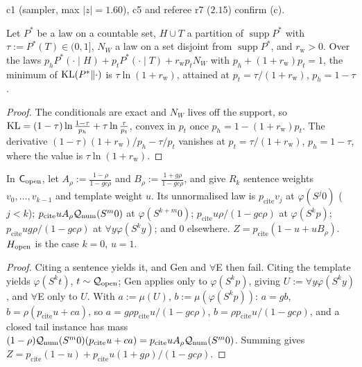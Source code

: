c1 (sampler, max $\lvert z\rvert=1.60$), c5 and referee r7 ($2.15$) confirm (c).

\begin{lemma}[Waste]\label{lem:univ:waste}
Let $P^*$ be a law on a countable set, $H\cup T$ a partition of $\operatorname{supp}P^*$ with $\tau:=P^*(T)\in(0,1]$, $N_W$ a law on a set disjoint from $\operatorname{supp}P^*$, and $r_{\mathrm w}>0$. Over the laws $p_hP^*(\cdot\mid H)+p_tP^*(\cdot\mid T)+r_{\mathrm w}p_tN_W$ with $p_h+(1+r_{\mathrm w})p_t=1$, the minimum of $\mathrm{KL}(P^*\|\cdot)$ is $\tau\ln(1+r_{\mathrm w})$, attained at $p_t=\tau/(1+r_{\mathrm w})$, $p_h=1-\tau$.
\end{lemma}

\begin{proof}
The conditionals are exact and $N_W$ lives off the support, so $\mathrm{KL}=(1-\tau)\ln\frac{1-\tau}{p_h}+\tau\ln\frac\tau{p_t}$, convex in $p_t$ once $p_h=1-(1+r_{\mathrm w})p_t$. The derivative $(1-\tau)(1+r_{\mathrm w})/p_h-\tau/p_t$ vanishes at $p_t=\tau/(1+r_{\mathrm w})$, $p_h=1-\tau$, where the value is $\tau\ln(1+r_{\mathrm w})$.
\end{proof}

\begin{proposition}\label{prop:univ:rk}
In $\mathsf{C}_{\mathrm{open}}$, let $A_\rho:=\frac{1-\rho}{1-gc\rho}$ and $B_\rho:=\frac{1+g\rho}{1-gc\rho}$, and give $R_k$ sentence weights $v_0,\dots,v_{k-1}$ and template weight $u$. Its unnormalised law is $p_{\mathrm{cite}}v_j$ at $\varphi(S^j0)$ ($j<k$); $p_{\mathrm{cite}}uA_\rho\mathcal{Q}_{\mathrm{num}}(S^m0)$ at $\varphi(S^{k+m}0)$; $p_{\mathrm{cite}}u\rho/(1-gc\rho)$ at $\varphi(S^kp)$; $p_{\mathrm{cite}}ug\rho/(1-gc\rho)$ at $\forall y\varphi(S^ky)$; and $0$ elsewhere. $Z=p_{\mathrm{cite}}(1-u+uB_\rho)$. $H_{\mathrm{open}}$ is the case $k=0$, $u=1$.
\end{proposition}

\begin{proof}
Citing a sentence yields it, and Gen and $\forall$E then fail. Citing the template yields $\varphi(S^kt)$, $t\sim\mathcal{Q}_{\mathrm{open}}$; Gen applies only to $\varphi(S^kp)$, giving $U:=\forall y\varphi(S^ky)$, and $\forall$E only to $U$. With $a:=\mu(U)$, $b:=\mu(\varphi(S^kp))$: $a=gb$, $b=\rho(p_{\mathrm{cite}}u+ca)$, so $a=g\rho p_{\mathrm{cite}}u/(1-gc\rho)$, $b=\rho p_{\mathrm{cite}}u/(1-gc\rho)$, and a closed tail instance has mass $(1-\rho)\mathcal{Q}_{\mathrm{num}}(S^m0)(p_{\mathrm{cite}}u+ca)=p_{\mathrm{cite}}uA_\rho\mathcal{Q}_{\mathrm{num}}(S^m0)$. Summing gives $Z=p_{\mathrm{cite}}(1-u)+p_{\mathrm{cite}}u(1+g\rho)/(1-gc\rho)$.
\end{proof}

